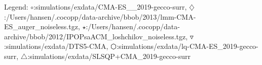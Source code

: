 Legend: {\color{NavyBlue}$\circ$}:simulations/exdata/CMA-ES\_\_2019-gecco-surr, {\color{Magenta}$\diamondsuit$}:/Users/hansen/.cocopp/data-archive/bbob/2013/lmm-CMA-ES\_auger\_noiseless.tgz, {\color{Orange}$\star$}:/Users/hansen/.cocopp/data-archive/bbob/2012/IPOPsaACM\_loshchilov\_noiseless.tgz, {\color{CornflowerBlue}$\triangledown$}:simulations/exdata/DTS5-CMA, {\color{red}$\varhexagon$}:simulations/exdata/lq-CMA-ES\_2019-gecco-surr, {\color{YellowGreen}$\triangle$}:simulations/exdata/SLSQP+CMA\_2019-gecco-surr